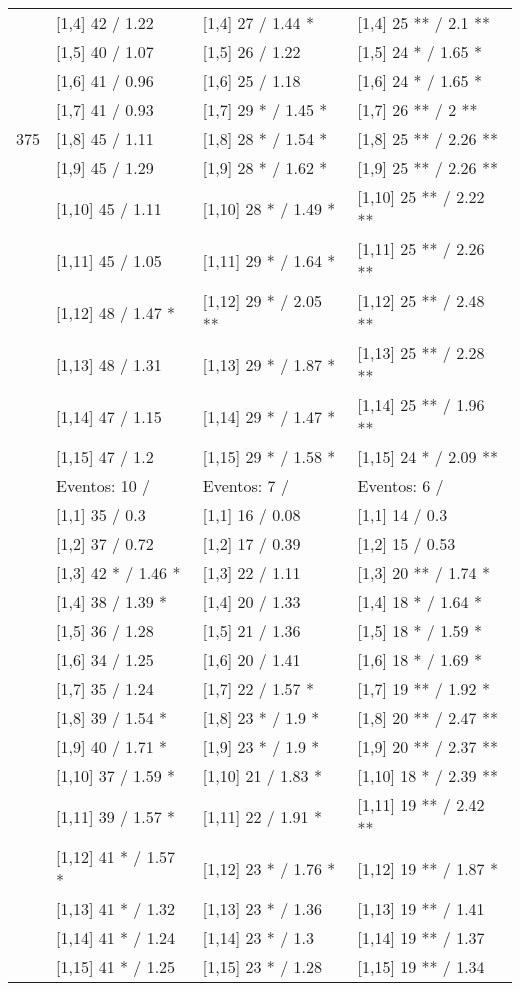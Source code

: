\begin{table}
\begin{tabular}[t]{llll}
\addlinespace
 & {}[1,4] 42  / 1.22 & {}[1,4] 27  / 1.44 * & {}[1,4] 25 ** / 2.1 **\\
 & {}[1,5] 40  / 1.07 & {}[1,5] 26  / 1.22 & {}[1,5] 24 * / 1.65 *\\
 & {}[1,6] 41  / 0.96 & {}[1,6] 25  / 1.18 & {}[1,6] 24 * / 1.65 *\\
 & {}[1,7] 41  / 0.93 & {}[1,7] 29 * / 1.45 * & {}[1,7] 26 ** / 2 **\\
375 & {}[1,8] 45  / 1.11 & {}[1,8] 28 * / 1.54 * & {}[1,8] 25 ** / 2.26 **\\
\addlinespace
 & {}[1,9] 45  / 1.29 & {}[1,9] 28 * / 1.62 * & {}[1,9] 25 ** / 2.26 **\\
 & {}[1,10] 45  / 1.11 & {}[1,10] 28 * / 1.49 * & {}[1,10] 25 ** / 2.22 **\\
 & {}[1,11] 45  / 1.05 & {}[1,11] 29 * / 1.64 * & {}[1,11] 25 ** / 2.26 **\\
 & {}[1,12] 48  / 1.47 * & {}[1,12] 29 * / 2.05 ** & {}[1,12] 25 ** / 2.48 **\\
 & {}[1,13] 48  / 1.31 & {}[1,13] 29 * / 1.87 * & {}[1,13] 25 ** / 2.28 **\\
\addlinespace
 & {}[1,14] 47  / 1.15 & {}[1,14] 29 * / 1.47 * & {}[1,14] 25 ** / 1.96 **\\
 & {}[1,15] 47  / 1.2 & {}[1,15] 29 * / 1.58 * & {}[1,15] 24 * / 2.09 **\\
 & Eventos:  10 / & Eventos:  7 / & Eventos:  6 /\\
 & {}[1,1] 35  / 0.3 & {}[1,1] 16  / 0.08 & {}[1,1] 14  / 0.3\\
 & {}[1,2] 37  / 0.72 & {}[1,2] 17  / 0.39 & {}[1,2] 15  / 0.53\\
\addlinespace
 & {}[1,3] 42 * / 1.46 * & {}[1,3] 22  / 1.11 & {}[1,3] 20 ** / 1.74 *\\
 & {}[1,4] 38  / 1.39 * & {}[1,4] 20  / 1.33 & {}[1,4] 18 * / 1.64 *\\
 & {}[1,5] 36  / 1.28 & {}[1,5] 21  / 1.36 & {}[1,5] 18 * / 1.59 *\\
 & {}[1,6] 34  / 1.25 & {}[1,6] 20  / 1.41 & {}[1,6] 18 * / 1.69 *\\
 & {}[1,7] 35  / 1.24 & {}[1,7] 22  / 1.57 * & {}[1,7] 19 ** / 1.92 *\\
\addlinespace
500 & {}[1,8] 39  / 1.54 * & {}[1,8] 23 * / 1.9 * & {}[1,8] 20 ** / 2.47 **\\
 & {}[1,9] 40  / 1.71 * & {}[1,9] 23 * / 1.9 * & {}[1,9] 20 ** / 2.37 **\\
 & {}[1,10] 37  / 1.59 * & {}[1,10] 21  / 1.83 * & {}[1,10] 18 * / 2.39 **\\
 & {}[1,11] 39  / 1.57 * & {}[1,11] 22  / 1.91 * & {}[1,11] 19 ** / 2.42 **\\
 & {}[1,12] 41 * / 1.57 * & {}[1,12] 23 * / 1.76 * & {}[1,12] 19 ** / 1.87 *\\
\addlinespace
 & {}[1,13] 41 * / 1.32 & {}[1,13] 23 * / 1.36 & {}[1,13] 19 ** / 1.41\\
 & {}[1,14] 41 * / 1.24 & {}[1,14] 23 * / 1.3 & {}[1,14] 19 ** / 1.37\\
 & {}[1,15] 41 * / 1.25 & {}[1,15] 23 * / 1.28 & {}[1,15] 19 ** / 1.34\\
\bottomrule
\end{tabular}
\end{table}
